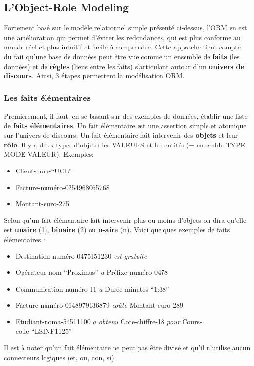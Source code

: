 \subsection{L'Object-Role Modeling}
Fortement basé sur le modèle relationnel simple présenté ci-dessus,
l'ORM en est une amélioration qui permet d'éviter les redondances,
qui est plus conforme au monde réel et plus intuitif et facile à comprendre.
Cette approche tient compte du fait qu'une base de données
peut être vue comme un ensemble de \textbf{faits} (les données)
et de \textbf{règles} (liens entre les faits) s'articulant autour
d'un \textbf{univers de discours}.
Ainsi, 3 étapes permettent la modélisation ORM.

\subsubsection{Les faits élémentaires}
Premièrement,
il faut, en se basant sur des exemples de données,
établir une liste de \textbf{faits élémentaires}.
Un fait élémentaire est une assertion simple et atomique
sur l'univers de discours.
Un fait élémentaire fait intervenir des \textbf{objets} et leur \textbf{rôle}.
Il y a deux types d'objets:
les VALEURS et les entités (= ensemble TYPE-MODE-VALEUR).
Exemples:
\begin{itemize}
  \item Client-nom-``UCL''
  \item Facture-numéro-0254968065768
  \item Montant-euro-275
\end{itemize}

Selon qu'un fait élémentaire fait intervenir plus ou moins d'objets
on dira qu'elle est \textbf{unaire} (1),
\textbf{binaire} (2) ou \textbf{n-aire} (n).
Voici quelques exemples de faits élémentaires :
\begin{itemize}
  \item Destination-numéro-0475151230 \emph{est gratuite}
  \item Opérateur-nom-``Proximus'' \emph{a} Préfixe-numéro-0478
  \item Communication-numéro-11 \emph{a} Durée-minutes-``1:38''
  \item Facture-numéro-0648979136879 \emph{coûte} Montant-euro-289
  \item Etudiant-noma-54511100 \emph{a obtenu} Cote-chiffre-18
    \emph{pour} Cours-code-``LSINF1125''
\end{itemize}
Il est à noter qu'un fait élémentaire ne peut pas être divisé et
qu'il n'utilise aucun connecteurs logiques (et, ou, non, si).


